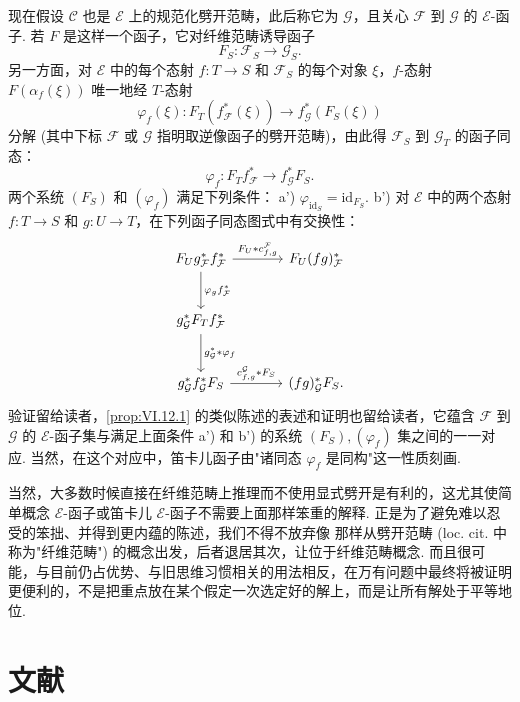 现在假设 $\mathcal{C}$ 也是 $\mathcal{E}$ 上的规范化劈开范畴，此后称它为 $\mathcal{G}$，且关心 $\mathcal{F}$ 到 $\mathcal{G}$ 的 $\mathcal{E}$-函子. 若 $F$ 是这样一个函子，它对纤维范畴诱导函子
\[
F_S \colon \mathcal{F}_S \longrightarrow \mathcal{G}_S.
\]
另一方面，对 $\mathcal{E}$ 中的每个态射 $f \colon T \to S$ 和 $\mathcal{F}_S$ 的每个对象 $\xi$，$f$-态射 $F(\alpha_f(\xi))$ 唯一地经 $T$-态射
\[
\varphi_f(\xi) \colon F_T(f_{\mathcal{F}}^{*}(\xi)) \longrightarrow f_{\mathcal{G}}^{*}(F_S(\xi))
\]
分解 (其中下标 $\mathcal{F}$ 或 $\mathcal{G}$ 指明取逆像函子的劈开范畴)，由此得 $\mathcal{F}_S$ 到 $\mathcal{G}_T$ 的函子同态：
\[
\varphi_f \colon F_T f_{\mathcal{F}}^{*} \longrightarrow f_{\mathcal{G}}^{*} F_S.
\]
两个系统 $(F_S)$ 和 $(\varphi_f)$ 满足下列条件：
a') $\varphi_{\mathrm{id}_S} = \mathrm{id}_{F_S}$.
b') 对 $\mathcal{E}$ 中的两个态射 $f \colon T \to S$ 和 $g \colon U \to T$，在下列函子同态图式中有交换性：
\[
\begin{tikzcd}[row sep=large, column sep=large]
F_U g_{\mathcal{F}}^{*} f_{\mathcal{F}}^{*} \arrow[r,"{F_U * c^{\mathcal{F}}_{f,g}}"] \arrow[d,"{\varphi_g f_{\mathcal{F}}^{*}}"] & F_U (fg)_{\mathcal{F}}^{*} \\
g_{\mathcal{G}}^{*} F_T f_{\mathcal{F}}^{*} \arrow[d,"{g_{\mathcal{G}}^{*} * \varphi_f}"] & \\
g_{\mathcal{G}}^{*} f_{\mathcal{G}}^{*} F_S \arrow[r,"{c^{\mathcal{G}}_{f,g} * F_S}"] & (fg)_{\mathcal{G}}^{*} F_S.
\end{tikzcd}
\]
验证留给读者，\cref{prop:VI.12.1} 的类似陈述的表述和证明也留给读者，它蕴含 $\mathcal{F}$ 到 $\mathcal{G}$ 的 $\mathcal{E}$-函子集与满足上面条件 a') 和 b') 的系统 $(F_S), (\varphi_f)$ 集之间的一一对应. 当然，在这个对应中，笛卡儿函子由"诸同态 $\varphi_f$ 是同构"这一性质刻画.

\begin{remarkstar}
当然，大多数时候直接在纤维范畴上推理而不使用显式劈开是有利的，这尤其使简单概念 $\mathcal{E}$-函子或笛卡儿 $\mathcal{E}$-函子不需要上面那样笨重的解释. 正是为了避免难以忍受的笨拙、并得到更内蕴的陈述，我们不得不放弃像 \cite{exp06-2} 那样从劈开范畴 (loc. cit. 中称为"纤维范畴") 的概念出发，后者退居其次，让位于纤维范畴概念. 而且很可能，与目前仍占优势、与旧思维习惯相关的用法相反，在万有问题中最终将被证明更便利的，不是把重点放在某个假定一次选定好的解上，而是让所有解处于平等地位.
\end{remarkstar}

\section{文献}\printbibliography[heading=none]


